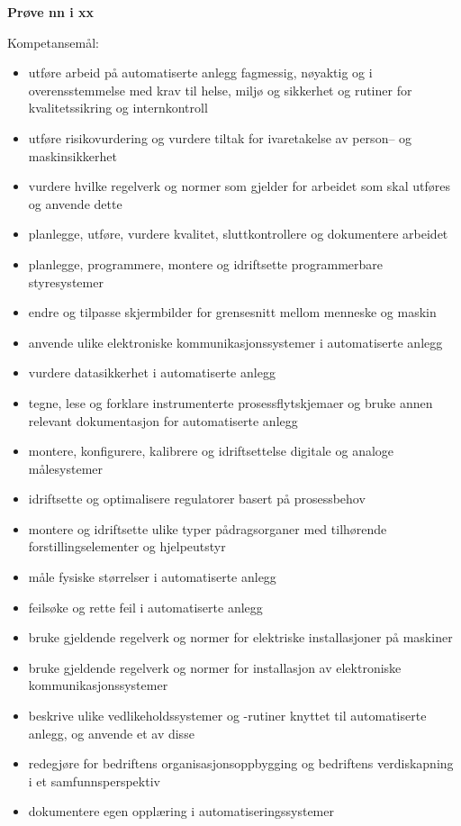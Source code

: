 
\centerline\textbf{Prøve nn  i xx }  \bigskip

Kompetansemål:
\begin{itemize}[noitemsep]
\item utføre arbeid på automatiserte anlegg fagmessig, nøyaktig og i overensstemmelse med krav til helse, miljø og sikkerhet og rutiner for kvalitetssikring og internkontroll
\item utføre risikovurdering og vurdere tiltak for ivaretakelse av person– og maskinsikkerhet
\item vurdere hvilke regelverk og normer som gjelder for arbeidet som skal utføres og anvende dette
\item planlegge, utføre, vurdere kvalitet, sluttkontrollere og dokumentere arbeidet
\item planlegge, programmere, montere og idriftsette programmerbare styresystemer
\item endre og tilpasse skjermbilder for grensesnitt mellom menneske og maskin
\item anvende ulike elektroniske kommunikasjonssystemer i automatiserte anlegg
\item vurdere datasikkerhet i automatiserte anlegg
\item tegne, lese og forklare instrumenterte prosessflytskjemaer og bruke annen relevant dokumentasjon for automatiserte anlegg
\item montere, konfigurere, kalibrere og idriftsettelse digitale og analoge målesystemer
\item idriftsette og optimalisere regulatorer basert på prosessbehov
\item montere og idriftsette ulike typer pådragsorganer med tilhørende forstillingselementer og hjelpeutstyr
\item måle fysiske størrelser i automatiserte anlegg
\item feilsøke og rette feil i automatiserte anlegg
\item bruke gjeldende regelverk og normer for elektriske installasjoner på maskiner
\item bruke gjeldende regelverk og normer for installasjon av elektroniske kommunikasjonssystemer
\item beskrive ulike vedlikeholdssystemer og -rutiner knyttet til automatiserte anlegg, og anvende et av disse
\item redegjøre for bedriftens organisasjonsoppbygging og bedriftens verdiskapning i et samfunnsperspektiv
\item dokumentere egen opplæring i automatiseringssystemer
\end{itemize}

